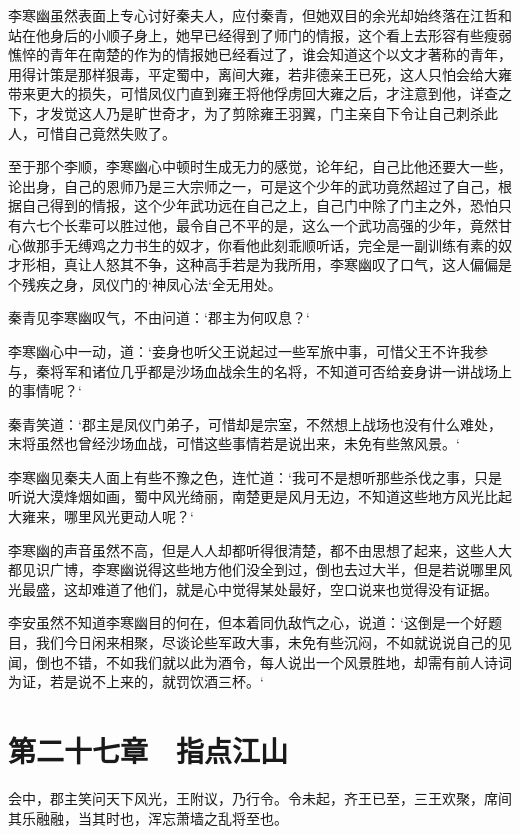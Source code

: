 李寒幽虽然表面上专心讨好秦夫人，应付秦青，但她双目的余光却始终落在江哲和站在他身后的小顺子身上，她早已经得到了师门的情报，这个看上去形容有些瘦弱憔悴的青年在南楚的作为的情报她已经看过了，谁会知道这个以文才著称的青年，用得计策是那样狠毒，平定蜀中，离间大雍，若非德亲王已死，这人只怕会给大雍带来更大的损失，可惜凤仪门直到雍王将他俘虏回大雍之后，才注意到他，详查之下，才发觉这人乃是旷世奇才，为了剪除雍王羽翼，门主亲自下令让自己刺杀此人，可惜自己竟然失败了。

至于那个李顺，李寒幽心中顿时生成无力的感觉，论年纪，自己比他还要大一些，论出身，自己的恩师乃是三大宗师之一，可是这个少年的武功竟然超过了自己，根据自己得到的情报，这个少年武功远在自己之上，自己门中除了门主之外，恐怕只有六七个长辈可以胜过他，最令自己不平的是，这么一个武功高强的少年，竟然甘心做那手无缚鸡之力书生的奴才，你看他此刻乖顺听话，完全是一副训练有素的奴才形相，真让人怒其不争，这种高手若是为我所用，李寒幽叹了口气，这人偏偏是个残疾之身，凤仪门的‘神凤心法‘全无用处。

秦青见李寒幽叹气，不由问道：‘郡主为何叹息？‘

李寒幽心中一动，道：‘妾身也听父王说起过一些军旅中事，可惜父王不许我参与，秦将军和诸位几乎都是沙场血战余生的名将，不知道可否给妾身讲一讲战场上的事情呢？‘

秦青笑道：‘郡主是凤仪门弟子，可惜却是宗室，不然想上战场也没有什么难处，末将虽然也曾经沙场血战，可惜这些事情若是说出来，未免有些煞风景。‘

李寒幽见秦夫人面上有些不豫之色，连忙道：‘我可不是想听那些杀伐之事，只是听说大漠烽烟如画，蜀中风光绮丽，南楚更是风月无边，不知道这些地方风光比起大雍来，哪里风光更动人呢？‘

李寒幽的声音虽然不高，但是人人却都听得很清楚，都不由思想了起来，这些人大都见识广博，李寒幽说得这些地方他们没全到过，倒也去过大半，但是若说哪里风光最盛，这却难道了他们，就是心中觉得某处最好，空口说来也觉得没有证据。

李安虽然不知道李寒幽目的何在，但本着同仇敌忾之心，说道：‘这倒是一个好题目，我们今日闲来相聚，尽谈论些军政大事，未免有些沉闷，不如就说说自己的见闻，倒也不错，不如我们就以此为酒令，每人说出一个风景胜地，却需有前人诗词为证，若是说不上来的，就罚饮酒三杯。‘

\chapter{第二十七章　指点江山}

会中，郡主笑问天下风光，王附议，乃行令。令未起，齐王已至，三王欢聚，席间其乐融融，当其时也，浑忘萧墙之乱将至也。

